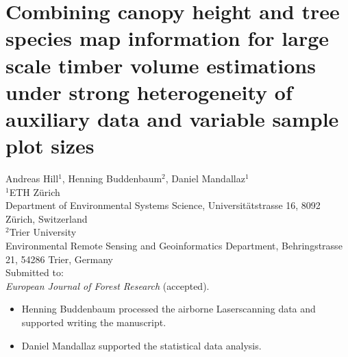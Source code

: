 \chapter{Combining canopy height and tree species map information for large scale timber volume estimations under strong heterogeneity of auxiliary data and variable sample plot sizes}
\label{chap:regmod}
{\large Andreas Hill$^1$, Henning Buddenbaum$^2$, Daniel Mandallaz$^1$}\\

\vspace{3cm}
\noindent
$^1$ETH Z\"urich\\Department of Environmental Systems Science, Universit\"atstrasse 16, 8092 Z\"urich, Switzerland \\

\noindent
$^2$Trier University\\Environmental Remote Sensing and Geoinformatics Department, Behringstrasse 21, 54286 Trier, Germany \\



\vspace{\fill}
\noindent
Submitted to:\\
\textit{European Journal of Forest Research} (accepted).

\newpage
\thispagestyle{plain}
\renewcommand{\labelitemi}{--}
\begin{itemize}
	\item Henning Buddenbaum processed the airborne Laserscanning data and supported writing the manuscript.
	\item Daniel Mandallaz supported the statistical data analysis.
\end{itemize}

\clearpage
